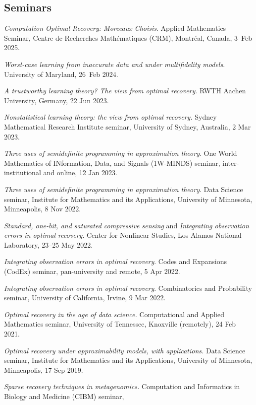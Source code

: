 \documentclass[11pt]{article}
\begin{document}
\subsection{Seminars}
\bitemize
\item {\sl Computation Optimal Recovery: Morceaux Choisis}. Applied Mathematics Seminar,
Centre de Recherches Math\'ematiques (CRM), Montr\'eal, Canada, 3~Feb 2025.
\item {\sl Worst-case learning from inaccurate data and under multifidelity models}.
University of Maryland, 26~Feb 2024.
\item {\sl A trustworthy learning theory? The view from optimal recovery}.
RWTH Aachen University, Germany, 22 Jun 2023.
\item {\sl Nonstatistical learning theory: the view from optimal recovery.}
Sydney Mathematical Research Institute seminar,
University of Sydney, Australia, 2 Mar 2023.
\item {\sl Three uses of semidefinite programming in approximation theory}.
One World Mathematics of INformation, Data, and Signals (1W-MINDS) seminar,
inter-institutional and online, 12 Jan 2023.
\item {\sl Three uses of semidefinite programming in approximation theory}.
 Data Science seminar,
 Institute for Mathematics and its Applications,
 University of Minnesota, Minneapolis, 8 Nov 2022.
\item {\sl Standard,  one-bit, and saturated compressive sensing} and {\sl Integrating observation errors in optimal recovery}.
Center for Nonlinear Studies, Los Alamos National Laboratory, 23--25 May 2022.
\item {\sl Integrating observation errors in optimal recovery}.  Codes and Expansions (CodEx) seminar,
pan-university and remote, 5 Apr 2022.
\item {\sl Integrating observation errors in optimal recovery}.
Combinatorics and Probability seminar, 
University of California, Irvine, 9 Mar 2022.
\item {\sl Optimal recovery in the age of data science.}
Computational and Applied Mathematics seminar,
University of Tennessee, Knoxville (remotely), 24 Feb 2021.
\item {\sl Optimal recovery under approximability models, with applications.}
 Data Science seminar,
 Institute for Mathematics and its Applications,
 University of Minnesota, Minneapolis, 17 Sep 2019.
\item {\sl Sparse recovery techniques in metagenomics.}
Computation and Informatics in Biology and Medicine (CIBM) seminar,
\end{document}
